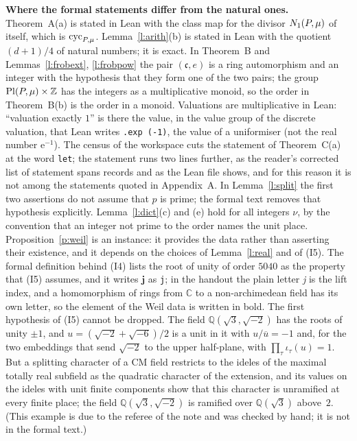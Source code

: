 \documentclass[11pt,a4paper]{article}
\newcommand{\Q}{\mathbb{Q}}
\newcommand{\Z}{\mathbb{Z}}
\newcommand{\subhead}[1]{\par\addvspace{9pt plus 2pt}\Needspace{4\baselineskip}\noindent\textbf{#1}\enspace\ignorespaces}
\theoremstyle{plainx}
\theoremstyle{uprightx}
\newcommand{\CC}{\mathbb{C}}
\newcommand{\emb}[1]{\iota_{#1}}              %
\newcommand{\cj}[1]{\overline{#1}}
\begin{document}
\subhead{Where the formal statements differ from the natural ones.} Theorem~A(a) is stated in Lean with the class map for the divisor $N_1(P,\mu)$ of itself, which is $\operatorname{cyc}_{P,\mu}$. Lemma~\ref{l:arith}(b) is stated in Lean with
the quotient $(d+1)/4$ of natural numbers; it is exact. In Theorem~B and Lemmas~\ref{l:frobext}, \ref{l:frobpow} the
pair $(\mathfrak{c},e)$ is a ring automorphism and an integer with the hypothesis that they form one of the two pairs; the
group $\PlP{P}{\mu}\times\Z$ has the integers as a multiplicative monoid, so the order in Theorem~B(b) is the order
in a monoid. Valuations are multiplicative in Lean: ``valuation exactly $1$'' is there the value, in the value group of
the discrete valuation, that Lean writes \texttt{.exp (-1)}, the value of a uniformiser (not the real number
$\mathrm{e}^{-1}$). The census of the workspace cuts the statement of Theorem~C(a) at the word \texttt{let}; the statement
runs two lines further, as the reader's corrected list of statement spans records and as the Lean file shows, and
for this reason it is not among the statements quoted in Appendix~A. In
Lemma~\ref{l:split} the first two assertions do not assume that $p$ is prime; the formal text removes that
hypothesis explicitly. Lemma~\ref{l:dict}(c) and (e) hold for all integers $\nu$, by the convention that an integer
not prime to the order names the unit place. Proposition~\ref{p:weil} is an instance: it provides the data rather
than asserting their existence, and it depends on the choices of Lemma~\ref{l:real} and of (I5). The formal
definition behind (I4) lists the root of unity of order $5040$ as the property that (I5) assumes, and it writes
$\mathbf{j}$ as \texttt{j}; in the handout the plain letter \emph{j} is the lift index, and a homomorphism of rings
from $\CC$ to a non-archimedean field has its own letter, so the element of the Weil data is written in bold. The first hypothesis of (I5) cannot be dropped. The field $\Q(\sqrt3,\sqrt{-2})$ has the roots of unity
$\pm1$, and $u=(\sqrt{-2}+\sqrt{-6})/2$ is a unit in it with $u/\cj u=-1$ and, for the two embeddings that send
$\sqrt{-2}$ to the upper half-plane, with $\prod_\tau\emb{\tau}(u)=1$. But a splitting character of a CM field restricts
to the ideles of the maximal totally real subfield as the quadratic character of the extension, and its values
on the ideles with unit finite components show that this character is unramified at every finite place; the
field $\Q(\sqrt3,\sqrt{-2})$ is ramified over $\Q(\sqrt3)$ above~$2$. (This example is due to the referee of the
note and was checked by hand; it is not in the formal text.)
\end{document}
